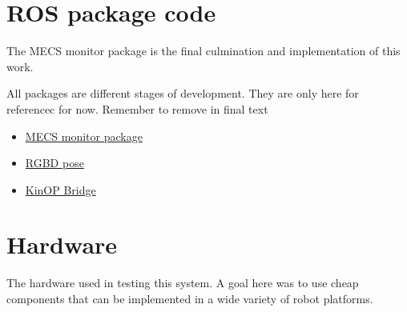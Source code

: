 \begin{appendices}
  \chapter{ROS package code}
  \label{appendix:ROSpackage}
  The MECS monitor package is the final culmination and implementation of this work.
  
  {\color{red}All packages are different stages of development. They are only here for referencec for now. Remember to remove in final text}
  \begin{itemize}
  \item\href{https://github.com/baardkrk/mecs_monitor}{MECS monitor package}
  \item\href{https://github.com/baardkrk/rgbd_pose}{RGBD pose}
  \item\href{https://github.com/baardkrk/kinop_bridge}{KinOP Bridge}
  \end{itemize}

  \chapter{Hardware}
  \label{appendix:hardware}

  The hardware used in testing this system. A goal here was to use cheap components that can be implemented in a wide variety of robot platforms.
  
\end{appendices}
